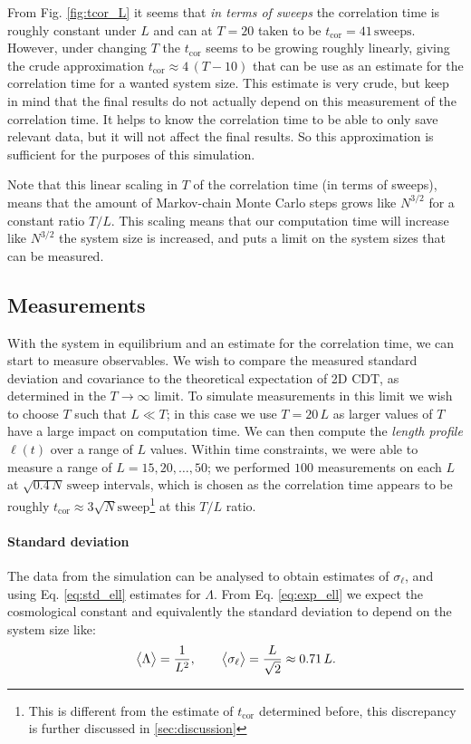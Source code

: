From Fig. \ref{fig:tcor_L} it seems that \emph{in terms of sweeps} the correlation time is roughly constant under $L$ and can at $T = 20$ taken to be $t_\text{cor} = 41 \, \text{sweeps}$.
However, under changing $T$ the $t_\text{cor}$ seems to be growing roughly linearly, giving the crude approximation $t_\text{cor} \approx 4\, (T - 10)$ that can be use as an estimate for the correlation time for a wanted system size.
This estimate is very crude, but keep in mind that the final results do not actually depend on this measurement of the correlation time. It helps to know the correlation time to be able to only save relevant data, but it will not affect the final results.
So this approximation is sufficient for the purposes of this simulation.

Note that this linear scaling in $T$ of the correlation time (in terms of sweeps), means that the amount of Markov-chain Monte Carlo steps grows like $N^{3/2}$ for a constant ratio $T/L$. This scaling means that our computation time will increase like $N^{3/2}$ the system size is increased, and puts a limit on the system sizes that can be measured.


\subsection{Measurements}
With the system in equilibrium and an estimate for the correlation time, we can start to measure observables.
We wish to compare the measured standard deviation and covariance to the theoretical expectation of 2D CDT, as determined in the $T \rightarrow \infty$ limit.
To simulate measurements in this limit we wish to choose $T$ such that $L \ll T$; in this case we use $T = 20 \, L$ as larger values of $T$ have a large impact on computation time.
We can then compute the \emph{length profile} $\ell(t)$ over a range of $L$ values.
Within time constraints, we were able to measure a range of $L = 15, 20, \dots, 50$; we performed $100$ measurements on each $L$ at $\sqrt{0.4 \, N} \, \text{sweep}$ intervals, which is chosen as the correlation time appears to be roughly $t_\text{cor} \approx 3 \sqrt{N} \text{sweep}$\footnote{This is different from the estimate of $t_\text{cor}$ determined before, this discrepancy is further discussed in \ref{sec:discussion}} at this $T/L$ ratio.

\paragraph{Standard deviation}
The data from the simulation can be analysed to obtain estimates of $\sigma_\ell$, and using Eq. \eqref{eq:std_ell} estimates for $\Lambda$.
From Eq. \eqref{eq:exp_ell} we expect the cosmological constant and equivalently the standard deviation to depend on the system size like:
\begin{equation}\label{eq:std_theory}
    \big\langle \Lambda \big\rangle = \frac{1}{L^2}, \qquad \big\langle \sigma_\ell \big\rangle = \frac{L}{\sqrt{2}} \approx 0.71 \, L.
\end{equation}

